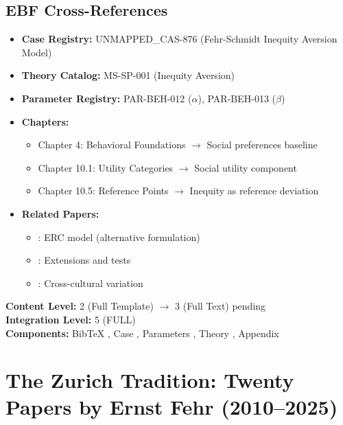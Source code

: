 \subsection{EBF Cross-References}

\begin{itemize}[nosep]
    \item \textbf{Case Registry:} UNMAPPED_CAS-876 (Fehr-Schmidt Inequity Aversion Model)
    \item \textbf{Theory Catalog:} MS-SP-001 (Inequity Aversion)
    \item \textbf{Parameter Registry:} PAR-BEH-012 ($\alpha$), PAR-BEH-013 ($\beta$)
    \item \textbf{Chapters:}
    \begin{itemize}[nosep]
        \item Chapter 4: Behavioral Foundations $\rightarrow$ Social preferences baseline
        \item Chapter 10.1: Utility Categories $\rightarrow$ Social utility component
        \item Chapter 10.5: Reference Points $\rightarrow$ Inequity as reference deviation
    \end{itemize}
    \item \textbf{Related Papers:}
    \begin{itemize}[nosep]
        \item \citet{bolton2000erc}: ERC model (alternative formulation)
        \item \citet{charness2002understanding}: Extensions and tests
        \item \citet{henrich2001search}: Cross-cultural variation
    \end{itemize}
\end{itemize}

\begin{tcolorbox}[colback=yellow!5!white, colframe=yellow!75!black,
    title=\textbf{Integration Status}]
\textbf{Content Level:} 2 (Full Template) $\rightarrow$ 3 (Full Text) pending \\
\textbf{Integration Level:} 5 (FULL) \checkmark \\
\textbf{Components:} BibTeX \checkmark, Case \checkmark, Parameters \checkmark, Theory \checkmark, Appendix \checkmark
\end{tcolorbox}


\section{The Zurich Tradition: Twenty Papers by Ernst Fehr (2010--2025)}
\label{app:fehrpapers}

